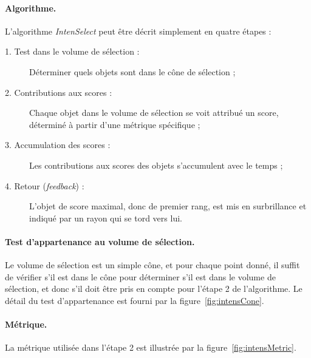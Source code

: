 	\paragraph{Algorithme.}
	L'algorithme \emph{IntenSelect} peut être décrit simplement en quatre étapes :
	
	\begin{description}
		\item[1. Test dans le volume de sélection :] Déterminer quels objets sont dans le cône de sélection ;
		\item[2. Contributions aux scores :] Chaque objet dans le volume de sélection se voit attribué un score, déterminé à partir d'une métrique spécifique ;
		\item[3. Accumulation des scores :] Les contributions aux scores des objets s'accumulent avec le temps ;
		\item[4. Retour (\emph{feedback}) :] L'objet de score maximal, donc de premier rang, est mis en surbrillance et indiqué par un rayon qui se \og tord \fg{} vers lui.
	\end{description}
	
	\paragraph{Test d'appartenance au volume de sélection.}
	Le volume de sélection est un simple cône, et pour chaque point donné, il suffit de vérifier s'il est dans le cône pour déterminer s'il est dans le volume de sélection, et donc s'il doit être pris en compte pour l'étape 2 de l'algorithme. Le détail du test d'appartenance est fourni par la figure~\ref{fig:intensCone}.
	
	\paragraph{Métrique.}
	La métrique utilisée dans l'étape 2 est illustrée par la figure~\ref{fig:intensMetric}.
	
